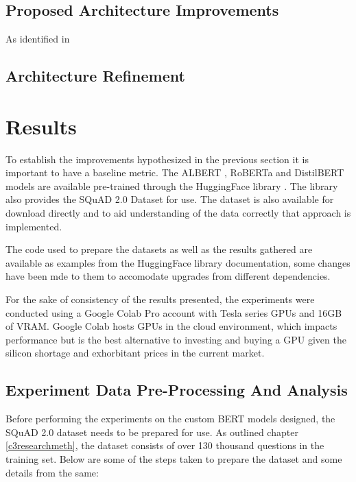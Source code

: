\documentclass[a4paper,12pt]{report}
\begin{document}
       \section{Proposed Architecture Improvements}\label{c43}

            As identified in
       \section{Architecture Refinement}\label{c44}

    \chapter{Results}\label{c5}

        To establish the improvements hypothesized in the previous section it is important to have a baseline metric. The ALBERT \citep{albert}, RoBERTa \citep{roberta} and DistilBERT \citep{distil} models are available pre-trained through the HuggingFace library \citep{hfTransformers}. The library also provides the SQuAD 2.0 Dataset \citep{dataset} for use. The dataset is also available for download directly and to aid understanding of the data correctly that approach is implemented.

        The code used to prepare the datasets as well as the results gathered are available as examples from the HuggingFace library documentation, some changes have been mde to them to accomodate upgrades from different dependencies.

        For the sake of consistency of the results presented, the experiments were conducted using a Google Colab Pro account with Tesla series GPUs and 16GB of VRAM. Google Colab hosts GPUs in the cloud environment, which impacts performance but is the best alternative to investing and buying a GPU given the silicon shortage and exhorbitant prices in the current market.

        \section{Experiment Data Pre-Processing And Analysis}

        Before performing the experiments on the custom BERT models designed, the SQuAD 2.0 dataset needs to be prepared for use. As outlined chapter \ref{c3researchmeth}, the dataset consists of over 130 thousand questions in the training set.
        Below are some of the steps taken to prepare the dataset and some details from the same:
\end{document}
